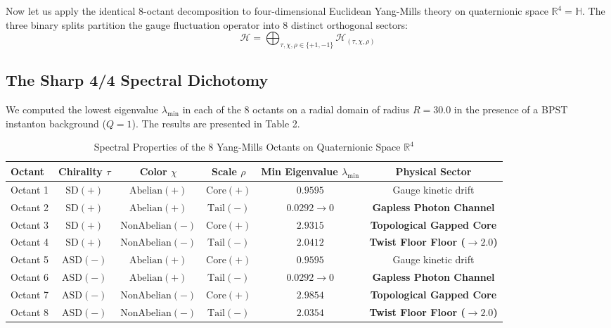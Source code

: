 \documentclass[11pt,a4paper]{article}
\begin{document}
Now let us apply the identical 8-octant decomposition to four-dimensional Euclidean Yang-Mills theory on quaternionic space $\mathbb{R}^4 = \mathbb{H}$. The three binary splits partition the gauge fluctuation operator into 8 distinct orthogonal sectors:
$$\mathcal{H} = \bigoplus_{\tau, \chi, \rho \in \{+1, -1\}} \mathcal{H}_{(\tau, \chi, \rho)}$$

\subsection{The Sharp 4/4 Spectral Dichotomy}

We computed the lowest eigenvalue $\lambda_{\min}$ in each of the 8 octants on a radial domain of radius $R = 30.0$ in the presence of a BPST instanton background ($Q = 1$). The results are presented in Table 2.

\begin{table}[h!]
\centering
\caption{Spectral Properties of the 8 Yang-Mills Octants on Quaternionic Space $\mathbb{R}^4$}
\vspace{0.2cm}
\begin{tabular}{lccccc}
\toprule
\textbf{Octant} & \textbf{Chirality $\tau$} & \textbf{Color $\chi$} & \textbf{Scale $\rho$} & \textbf{Min Eigenvalue $\lambda_{\min}$} & \textbf{Physical Sector} \\
\midrule
Octant 1 & $\mathrm{SD}(+)$ & $\mathrm{Abelian}(+)$ & $\mathrm{Core}(+)$ & $0.9595$ & Gauge kinetic drift \\
Octant 2 & $\mathrm{SD}(+)$ & $\mathrm{Abelian}(+)$ & $\mathrm{Tail}(-)$ & $0.0292 \to 0$ & \textbf{Gapless Photon Channel} \\
Octant 3 & $\mathrm{SD}(+)$ & $\mathrm{NonAbelian}(-)$ & $\mathrm{Core}(+)$ & \textbf{$2.9315$} & \textbf{Topological Gapped Core} \\
Octant 4 & $\mathrm{SD}(+)$ & $\mathrm{NonAbelian}(-)$ & $\mathrm{Tail}(-)$ & \textbf{$2.0412$} & \textbf{Twist Floor Floor ($\to 2.0$)} \\
Octant 5 & $\mathrm{ASD}(-)$ & $\mathrm{Abelian}(+)$ & $\mathrm{Core}(+)$ & $0.9595$ & Gauge kinetic drift \\
Octant 6 & $\mathrm{ASD}(-)$ & $\mathrm{Abelian}(+)$ & $\mathrm{Tail}(-)$ & $0.0292 \to 0$ & \textbf{Gapless Photon Channel} \\
Octant 7 & $\mathrm{ASD}(-)$ & $\mathrm{NonAbelian}(-)$ & $\mathrm{Core}(+)$ & \textbf{$2.9854$} & \textbf{Topological Gapped Core} \\
Octant 8 & $\mathrm{ASD}(-)$ & $\mathrm{NonAbelian}(-)$ & $\mathrm{Tail}(-)$ & \textbf{$2.0354$} & \textbf{Twist Floor Floor ($\to 2.0$)} \\
\bottomrule
\end{tabular}
\end{table}
\end{document}
